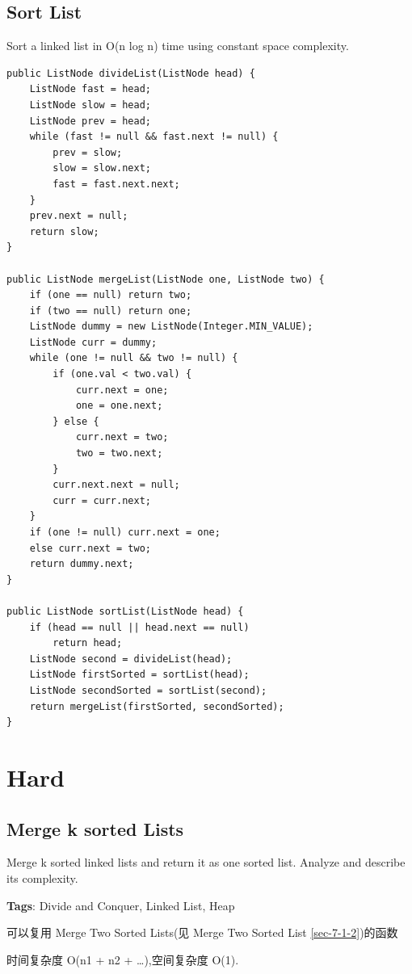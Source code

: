 \documentclass[12pt]{book}
\begin{document}
\subsection{Sort List}
\label{sec-7-2-2}
Sort a linked list in O(n log n) time using constant space complexity.

\lstset{language=java,label= ,caption= ,numbers=none}
\begin{lstlisting}
public ListNode divideList(ListNode head) {
    ListNode fast = head;
    ListNode slow = head;
    ListNode prev = head;
    while (fast != null && fast.next != null) {
        prev = slow;
        slow = slow.next;
        fast = fast.next.next;
    }
    prev.next = null;
    return slow;
}

public ListNode mergeList(ListNode one, ListNode two) {
    if (one == null) return two;
    if (two == null) return one;
    ListNode dummy = new ListNode(Integer.MIN_VALUE);
    ListNode curr = dummy;
    while (one != null && two != null) {
        if (one.val < two.val) {
            curr.next = one;
            one = one.next;
        } else {
            curr.next = two;
            two = two.next;
        }
        curr.next.next = null;
        curr = curr.next;
    }
    if (one != null) curr.next = one;
    else curr.next = two;
    return dummy.next;
}

public ListNode sortList(ListNode head) {
    if (head == null || head.next == null) 
        return head;
    ListNode second = divideList(head);
    ListNode firstSorted = sortList(head);
    ListNode secondSorted = sortList(second);
    return mergeList(firstSorted, secondSorted);
}
\end{lstlisting}

\section{Hard}
\label{sec-7-3}
\subsection{Merge k sorted Lists}
\label{sec-7-3-1}
Merge k sorted linked lists and return it as one sorted list. Analyze and describe its complexity.

\textbf{Tags}: Divide and Conquer, Linked List, Heap

可以复用 Merge Two Sorted Lists(见 Merge Two Sorted List \ref{sec-7-1-2})的函数

时间复杂度 O(n1 + n2 + \ldots{}),空间复杂度 O(1). 
\end{document}
